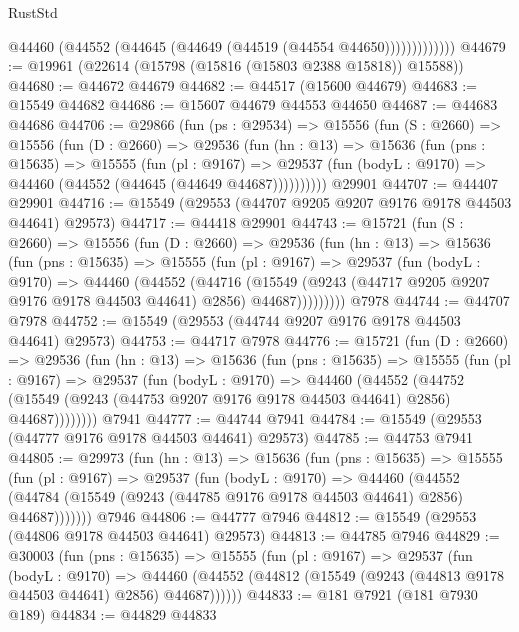 \begin{lexlean}{RustStd}
\begin{coremodule}
                  @44460 (@44552 (@44645 (@44649 (@44519 (@44554 @44650)))))))))))))
@44679 := @19961 (@22614 (@15798 (@15816 (@15803 @2388 @15818)) @15588))
@44680 := @44672 @44679
@44682 := @44517 (@15600 @44679)
@44683 := @15549 @44682
@44686 := @15607 @44679 @44553 @44650
@44687 := @44683 @44686
@44706 := @29866
    (fun (ps : @29534) =>
    @15556
      (fun (S : @2660) =>
      @15556
        (fun (D : @2660) =>
        @29536
          (fun (hn : @13) =>
          @15636
            (fun (pns : @15635) =>
            @15555
              (fun (pl : @9167) =>
              @29537 (fun (bodyL : @9170) => @44460 (@44552 (@44645 (@44649 @44687))))))))))
    @29901
@44707 := @44407 @29901
@44716 := @15549 (@29553 (@44707 @9205 @9207 @9176 @9178 @44503 @44641) @29573)
@44717 := @44418 @29901
@44743 := @15721
    (fun (S : @2660) =>
    @15556
      (fun (D : @2660) =>
      @29536
        (fun (hn : @13) =>
        @15636
          (fun (pns : @15635) =>
          @15555
            (fun (pl : @9167) =>
            @29537
              (fun (bodyL : @9170) =>
              @44460
                (@44552
                  (@44716
                    (@15549
                      (@9243 (@44717 @9205 @9207 @9176 @9178 @44503 @44641) @2856)
                      @44687)))))))))
    @7978
@44744 := @44707 @7978
@44752 := @15549 (@29553 (@44744 @9207 @9176 @9178 @44503 @44641) @29573)
@44753 := @44717 @7978
@44776 := @15721
    (fun (D : @2660) =>
    @29536
      (fun (hn : @13) =>
      @15636
        (fun (pns : @15635) =>
        @15555
          (fun (pl : @9167) =>
          @29537
            (fun (bodyL : @9170) =>
            @44460
              (@44552
                (@44752
                  (@15549 (@9243 (@44753 @9207 @9176 @9178 @44503 @44641) @2856) @44687))))))))
    @7941
@44777 := @44744 @7941
@44784 := @15549 (@29553 (@44777 @9176 @9178 @44503 @44641) @29573)
@44785 := @44753 @7941
@44805 := @29973
    (fun (hn : @13) =>
    @15636
      (fun (pns : @15635) =>
      @15555
        (fun (pl : @9167) =>
        @29537
          (fun (bodyL : @9170) =>
          @44460
            (@44552 (@44784 (@15549 (@9243 (@44785 @9176 @9178 @44503 @44641) @2856) @44687)))))))
    @7946
@44806 := @44777 @7946
@44812 := @15549 (@29553 (@44806 @9178 @44503 @44641) @29573)
@44813 := @44785 @7946
@44829 := @30003
    (fun (pns : @15635) =>
    @15555
      (fun (pl : @9167) =>
      @29537
        (fun (bodyL : @9170) =>
        @44460 (@44552 (@44812 (@15549 (@9243 (@44813 @9178 @44503 @44641) @2856) @44687))))))
@44833 := @181 @7921 (@181 @7930 @189)
@44834 := @44829 @44833

\end{coremodule}
\end{lexlean}
